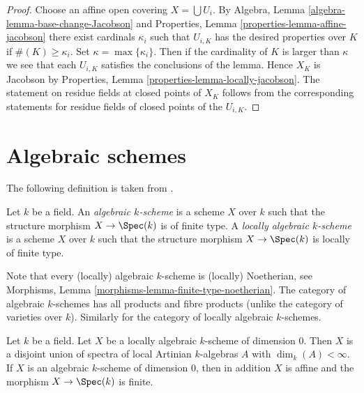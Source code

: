 \begin{proof}
Choose an affine open covering $X = \bigcup U_i$.
By
Algebra, Lemma \ref{algebra-lemma-base-change-Jacobson}
and
Properties, Lemma \ref{properties-lemma-affine-jacobson}
there exist cardinals $\kappa_i$ such that $U_{i, K}$ has
the desired properties over $K$ if $\#(K) \geq \kappa_i$.
Set $\kappa = \max\{\kappa_i\}$. Then if the cardinality of
$K$ is larger than $\kappa$ we see that each $U_{i, K}$ satisfies
the conclusions of the lemma. Hence $X_K$ is Jacobson by
Properties, Lemma \ref{properties-lemma-locally-jacobson}.
The statement on residue fields at closed points of $X_K$
follows from the corresponding
statements for residue fields of closed points of the $U_{i, K}$.
\end{proof}





\section{Algebraic schemes}
\label{section-algebraic-schemes}

\noindent
The following definition is taken from
\cite[I Definition 6.4.1]{EGA}.

\begin{definition}
\label{definition-algebraic-scheme}
Let $k$ be a field. An {\it algebraic $k$-scheme} is a scheme $X$ over $k$
such that the structure morphism $X \to \Spec(k)$ is of
finite type. A {\it locally algebraic $k$-scheme} is a scheme $X$ over $k$
such that the structure morphism $X \to \Spec(k)$ is
locally of finite type.
\end{definition}

\noindent
Note that every (locally) algebraic $k$-scheme is (locally) Noetherian, see
Morphisms, Lemma \ref{morphisms-lemma-finite-type-noetherian}.
The category of algebraic $k$-schemes has all products and fibre products
(unlike the category of varieties over $k$). Similarly for the category
of locally algebraic $k$-schemes.

\begin{lemma}
\label{lemma-algebraic-scheme-dim-0}
Let $k$ be a field. Let $X$ be a locally algebraic $k$-scheme of
dimension $0$. Then $X$ is a disjoint union of spectra of local Artinian
$k$-algebras $A$ with $\dim_k(A) < \infty$. If $X$ is an algebraic $k$-scheme
of dimension $0$, then in addition $X$ is affine and the morphism
$X \to \Spec(k)$ is finite.
\end{lemma}

